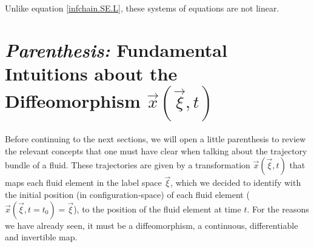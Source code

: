 \documentclass[11pt, a4paper]{article} %
\begin{document}
Unlike equation \eqref{infchain.SE.L}, these systems of equations are not linear.

\newpage
\section*{{\em Parenthesis: }Fundamental Intuitions about the Diffeomorphism $\vec{x}(\vec{\xi},t)$}

Before continuing to the next sections, we will open a little parenthesis to review the relevant concepts that one must have clear when talking about the trajectory bundle of a fluid. These trajectories are given by a transformation $\vec{x}(\vec{\xi},t)$ that maps each fluid element in the label space $\vec{\xi}$, which we decided to identify with the initial position (in configuration-space) of each fluid element ($\vec{x}(\vec{\xi},t=t_0)=\vec{\xi}$), to the position of the fluid element at time $t$. For the reasons we have already seen, it must be a diffeomorphism, a continuous, differentiable and invertible map. \vspace{-0.3cm}
\end{document}
